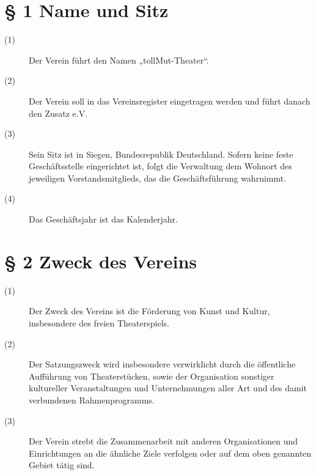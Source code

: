\documentclass[a4paper,12pt]{scrartcl}
\begin{document}
\newpage

\tableofcontents
\thispagestyle{empty}
\clearpage



\renewcommand{\sectionmark}[1]{\markright{#1}}
\renewcommand{\subsectionmark}[1]{}
\renewcommand{\subsubsectionmark}[1]{}
\rhead{\today}

\onehalfspacing
\renewcommand{\thesection}{\arabic{section}}
\renewcommand{\thesection}{\arabic{section}}
\setcounter{section}{0}
\setcounter{page}{1}


\section*{\S{} 1 Name und Sitz}
\begin{description} 

\item[(1)] Der Verein führt den Namen „tollMut-Theater“. \item[(2)] Der Verein soll in das Vereinsregister eingetragen werden und führt danach den Zusatz e.V.
\item[(3)] Sein Sitz ist in Siegen, Bundesrepublik Deutschland. Sofern keine feste Geschäftsstelle eingerichtet ist, folgt die Verwaltung dem Wohnort des jeweiligen Vorstandsmitglieds, das die Geschäftsführung wahrnimmt. 
\item[(4)] Das Geschäftsjahr ist das Kalenderjahr.

\end{description}



\section*{\S{} 2 Zweck des Vereins}
\begin{description} 

\item[(1)] Der Zweck des Vereins ist die Förderung von Kunst und Kultur, insbesondere des freien Theaterspiels.
\item[(2)] Der Satzungszweck wird insbesondere verwirklicht durch die öffentliche Aufführung von Theaterstücken, sowie der Organisation sonstiger kultureller Veranstaltungen und Unternehmungen aller Art und des damit verbundenen Rahmenprogramms.
\item[(3)] Der Verein strebt die Zusammenarbeit mit anderen Organisationen und Einrichtungen an die ähnliche Ziele verfolgen oder auf dem oben genannten Gebiet tätig sind.
 
\end{description}
\end{document}
